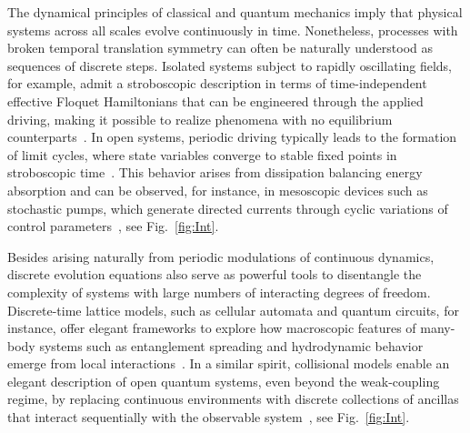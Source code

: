 \documentclass[aps,prl,reprint]{revtex4-2}
\begin{document}
\maketitle

The dynamical principles of classical and quantum mechanics imply that physical systems across all scales evolve continuously in time.
Nonetheless, processes with broken temporal translation symmetry can often be naturally understood as sequences of discrete steps.
Isolated systems subject to rapidly oscillating fields, for example, admit a stroboscopic description in terms of time-independent effective Floquet Hamiltonians that can be engineered through the applied driving, making it possible to realize phenomena with no equilibrium counterparts~\cite{bukovUniversalHighfrequencyBehavior2015,
eckardtColloquiumAtomicQuantum2017,
okaFloquetEngineeringQuantum2019}.
In open systems, periodic driving typically leads to the formation of limit cycles, where state variables converge to stable fixed points in stroboscopic time~\cite{moskaletsFloquetScatteringTheory2002,
rayStochasticThermodynamicsPeriodically2017,
menczelLimitCyclesPeriodically2019,
moriFloquetStatesOpen2023}.
This behavior arises from dissipation balancing energy absorption and can be observed, for instance, in mesoscopic devices such as stochastic pumps, which generate directed currents through cyclic variations of control parameters~\cite{sinitsynUniversalGeometricTheory2007,
rahavDirectedFlowNonadiabatic2008,
espositoStochasticThermodynamicsHidden2015,
razMimickingNonequilibriumSteady2016,
funoShortcutsAdiabaticPumping2020}, see Fig.~\ref{fig:Int}.

Besides arising naturally from periodic modulations of continuous dynamics, discrete evolution equations also serve as powerful tools to disentangle the complexity of systems with large numbers of interacting degrees of freedom.
Discrete-time lattice models, such as cellular automata and quantum circuits, for instance, offer elegant frameworks to explore how macroscopic features of many-body systems such as entanglement spreading and hydrodynamic behavior emerge from local interactions~\cite{nahumQuantumEntanglementGrowth2017,
nahumOperatorSpreadingRandom2018,
vonkeyserlingkOperatorHydrodynamicsOTOCs2018,
khemaniOperatorSpreadingEmergence2018,
chanSolutionMinimalModel2018,
rakovszkyDiffusiveHydrodynamicsOutofTimeOrdered2018,
rakovszkySubballisticGrowthRenyi2019,
bertiniEntanglementSpreadingMinimal2019,
klobasExactThermalizationDynamics2021,
klobasEntanglementDynamicsRule2021,
klobasExactRelaxationGibbs2021,
bucaRule54ExactlySolvableModel2021,
bertiniExactQuenchDynamics2024,
kimCircuitsSimplePlatform2025}.
In a similar spirit, collisional models enable an elegant description of open quantum systems, even beyond the weak-coupling regime, by replacing continuous environments with discrete collections of ancillas that interact sequentially with the observable
system~\cite{karevskiQuantumNonequilibriumSteady2009,
strasbergQuantumInformationThermodynamics2017,
strasbergRepeatedInteractionsQuantum2019,
seahCollisionalQuantumThermometry2019,
rodriguesThermodynamicsWeaklyCoherent2019}, see Fig.~\ref{fig:Int}.
\end{document}

